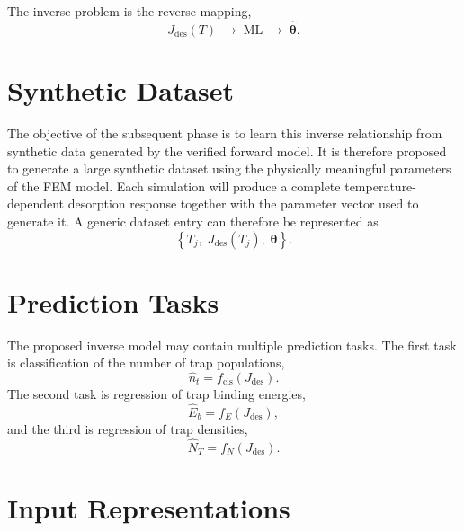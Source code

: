 \documentclass[a4paper,12pt,oneside]{report}
\begin{document}
The inverse problem is the reverse mapping,
\begin{equation}
  J_{\mathrm{des}}(T) \;\longrightarrow\; \text{ML} \;\longrightarrow\; \hat{\boldsymbol{\theta}}.
  \label{eq:inverse}
\end{equation}

\section{Synthetic Dataset}
\label{sec:dataset}

The objective of the subsequent phase is to learn this inverse relationship from synthetic data generated by the verified forward model. It is therefore proposed to generate a large synthetic dataset using the physically meaningful parameters of the FEM model. Each simulation will produce a complete temperature-dependent desorption response together with the parameter vector used to generate it. A generic dataset entry can therefore be represented as
\begin{equation}
  \left\{ T_j,\; J_{\mathrm{des}}(T_j),\; \boldsymbol{\theta} \right\}.
  \label{eq:entry}
\end{equation}

\section{Prediction Tasks}
\label{sec:tasks}

The proposed inverse model may contain multiple prediction tasks. The first task is classification of the number of trap populations,
\begin{equation}
  \hat{n}_t = f_{\mathrm{cls}}\!\left(J_{\mathrm{des}}\right).
  \label{eq:cls}
\end{equation}
The second task is regression of trap binding energies,
\begin{equation}
  \hat{E}_b = f_E\!\left(J_{\mathrm{des}}\right),
  \label{eq:regE}
\end{equation}
and the third is regression of trap densities,
\begin{equation}
  \hat{N}_T = f_N\!\left(J_{\mathrm{des}}\right).
  \label{eq:regN}
\end{equation}

\section{Input Representations}
\label{sec:inputs}
\end{document}
